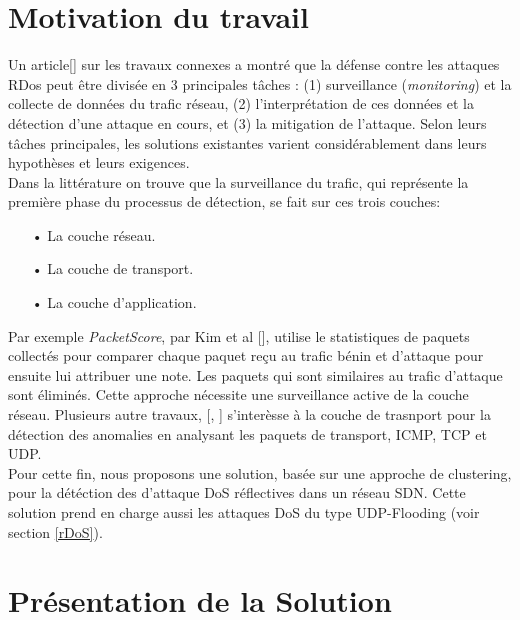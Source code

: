 \section{Motivation du travail}
Un article[\cite{21}] sur les travaux connexes a montré que la défense contre les attaques RDos peut être divisée en 3 principales tâches : (1) surveillance (\textit{monitoring}) et la collecte de données du trafic réseau, (2) l’interprétation de ces données et la détection d’une attaque en cours, et (3) la mitigation de l’attaque. Selon leurs tâches principales, les solutions existantes varient considérablement dans leurs hypothèses et leurs exigences.\\
Dans la littérature on trouve que la surveillance du trafic, qui représente la première phase du processus de détection, se fait sur ces trois couches:\\
\begin{itemize}
\item[•] La couche réseau.
\item[•] La couche de transport.
\item[•] La couche d'application.\\
\end{itemize}

Par exemple \textit{PacketScore}, par Kim et al [\cite{22}], utilise le statistiques de paquets collectés pour comparer chaque paquet reçu au trafic bénin et d’attaque pour ensuite lui attribuer une note. Les paquets qui sont similaires au trafic d’attaque sont éliminés. Cette approche nécessite une surveillance active de la couche réseau.
Plusieurs autre travaux, [\cite{23}, \cite{24}] s'interèsse à la couche de trasnport pour la détection des anomalies en analysant les paquets de transport, ICMP, TCP et UDP.\\

Pour cette fin, nous proposons une solution, basée sur une approche de clustering, pour la détéction des d'attaque DoS réflectives dans un réseau SDN. Cette solution prend en charge aussi les attaques DoS du type UDP-Flooding (voir section \ref{rDoS}).

\section{Présentation de la Solution}

